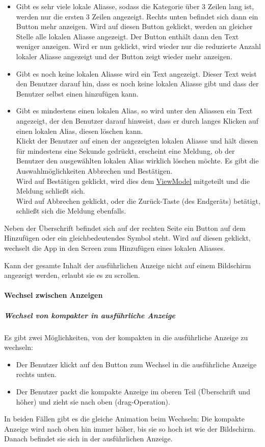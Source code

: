 \begin{itemize}
\begin{itemize}
        \item Gibt es sehr viele lokale Aliasse, sodass die Kategorie über 3 Zeilen lang ist, werden nur 
        die ersten 3 Zeilen angezeigt. Rechts unten befindet sich dann ein Button \dq{}mehr anzeigen\dq{}. 
        Wird auf diesen Button geklickt, werden an gleicher Stelle alle lokalen Aliasse angezeigt. 
        Der Button enthält dann den Text \dq{}weniger anzeigen\dq{}. Wird er nun geklickt, wird wieder nur die 
        reduzierte Anzahl lokaler Aliasse angezeigt und der Button zeigt wieder \dq{}mehr anzeigen\dq{}.
        \item Gibt es noch keine lokalen Aliasse wird ein Text angezeigt. Dieser Text weist den Benutzer 
        darauf hin, dass es noch keine lokalen Aliasse gibt und dass der Benutzer selbst einen hinzufügen kann.
        \item Gibt es mindestens einen lokalen Alias, so wird unter den Aliassen ein Text angezeigt, 
        der den Benutzer darauf hinweist, dass er durch langes Klicken auf einen lokalen Alias, diesen 
        löschen kann.\\
        Klickt der Benutzer auf einen der angezeigten lokalen Aliasse und hält diesen für mindestens eine 
        Sekunde gedrückt, erscheint eine Meldung, ob der Benutzer den ausgewählten lokalen Alias wirklich 
        löschen möchte. Es gibt die Auswahlmöglichkeiten \dq{}Abbrechen\dq{} und \dq{}Bestätigen\dq{}.\\ 
        Wird auf \dq{}Bestätigen\dq{} geklickt, wird dies dem \hyperref[App_ViewModel]{ViewModel} mitgeteilt und die Meldung schließt sich.\\
        Wird auf \dq{}Abbrechen\dq{} geklickt, oder die Zurück-Taste (des Endgeräts) betätigt, schließt sich die Meldung ebenfalls.
    \end{itemize}
    Neben der Überschrift befindet sich auf der rechten Seite ein Button auf dem \dq{}Hinzufügen\dq{} oder ein gleichbedeutendes Symbol steht. 
    Wird auf diesen geklickt, wechselt die App in den Screen zum Hinzufügen eines lokalen Aliasses.
\end{itemize}
Kann der gesamte Inhalt der ausführlichen Anzeige nicht auf einem Bildschirm angezeigt werden, erlaubt sie es zu scrollen.

\paragraph*{Wechsel zwischen Anzeigen}
\subparagraph*{Wechsel von kompakter in ausführliche Anzeige}
Es gibt zwei Möglichkeiten, von der kompakten in die ausführliche Anzeige zu wechseln:
\begin{itemize}
    \item Der Benutzer klickt auf den Button zum Wechsel in die ausführliche Anzeige rechts unten.
    \item Der Benutzer packt die kompakte Anzeige im oberen Teil (Überschrift und höher) und zieht sie nach oben (drag-Operation).
\end{itemize}
In beiden Fällen gibt es die gleiche Animation beim Wechseln: Die kompakte Anzeige wird nach oben hin immer 
höher, bis sie so hoch ist wie der Bildschirm. Danach befindet sie sich in der ausführlichen Anzeige.

